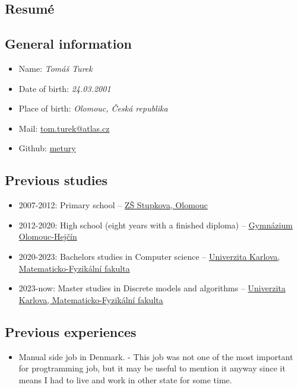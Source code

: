 \documentclass{article}
\begin{document}
\begin{center}
\section*{Resumé}
\end{center}

\subsection*{General information}

\begin{itemize}
	\item Name: \textit{Tomáš Turek}
	\item Date of birth: \textit{24.03.2001}
	\item Place of birth: \textit{Olomouc, Česká republika}
	\item Mail: \href{mailto:tom.turek@atlas.cz}{tom.turek@atlas.cz}
	\item Github: \href{https://github.com/metury}{metury}
\end{itemize}

\subsection*{Previous studies}

\begin{itemize}
	\item 2007-2012: Primary school -- \href{https://zsstupkova.cz/}{ZŠ Stupkova, Olomouc}
	\item 2012-2020: High school (eight years with a finished diploma) -- \href{https://www.gytool.cz/}{Gymnázium Olomouc-Hejčín}
	\item 2020-2023: Bachelors studies in Computer science -- \href{https://www.mff.cuni.cz/}{Univerzita Karlova, Matematicko-Fyzikální fakulta}
	\item 2023-now: Master studies in Discrete models and algorithms -- \href{https://www.mff.cuni.cz/}{Univerzita Karlova, Matematicko-Fyzikální fakulta}
\end{itemize}

\subsection*{Previous experiences}

\begin{itemize}
	\item Manual side job in Denmark. - This job was not one of the most important for progtramming job, but it may be useful to mention it anyway since it means I had to live and work in other state for some time.
\end{itemize}
\end{document}
